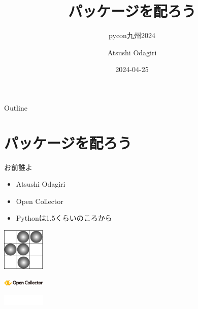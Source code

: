 \documentclass[presentation]{beamer}
\author{Atsushi Odagiri}
\date{2024-04-25}
\title{パッケージを配ろう}
\subtitle{pycon九州2024}
\begin{document}
\maketitle
\begin{frame}{Outline}
\tableofcontents
\end{frame}


\section{パッケージを配ろう}
\label{sec:org800ce16}
\begin{frame}[label={sec:org9ce5085}]{お前誰よ}
\begin{block}{}
\begin{itemize}
\item Atsushi Odagiri
\item Open Collector
\item Pythonは1.5くらいのころから
\end{itemize}
\end{block}

\begin{block}{}
\begin{center}
\includegraphics[width=2cm]{./r-penta512.png}
\end{center}

\begin{center}
\includegraphics[width=2cm]{./oc-logo.png}
\end{center}
\begin{center}
\includegraphics[width=2cm]{./logo-w.png}
\end{center}
\end{block}
\end{frame}
\end{document}

